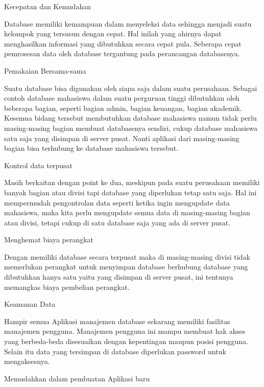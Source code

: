 \documentclass{wileySix}
\begin{document}
\begin{myEnumerate}
	\item Kecepatan dan Kemudahan \par
	Database memiliki kemampuan dalam menyeleksi data sehingga menjadi suatu kelompok yang tersusun dengan cepat. Hal inilah yang ahirnya dapat menghasilkan informasi yang dibutuhkan secara cepat pula. Seberapa cepat pemrosesan data oleh database tergantung pada perancangan databasenya. \par
	\vspace{12pt}
	\noindent 
	\item Pemakaian Bersama-sama \par
	Suatu database bisa digunakan oleh siapa saja dalam suatu perusahaan. Sebagai contoh database mahasiswa dalam suatu perguruan tinggi dibutuhkan oleh beberapa bagian, seperti bagian admin, bagian keuangan, bagian akademik. Kesemua bidang tersebut membutuhkan database mahasiswa namun tidak perlu masing-masing bagian membuat databasenya sendiri, cukup database mahasiswa satu saja yang disimpan di server pusat. Nanti aplikasi dari masing-masing bagian bisa terhubung ke database mahasiswa tersebut. \par
	\vspace{12pt}
	\noindent 
	\item Kontrol data terpusat \par
	Masih berkaitan dengan point ke dua, meskipun pada suatu perusahaan memiliki banyak bagian atau divisi tapi database yang diperlukan tetap satu saja. Hal ini mempermudah pengontrolan data seperti ketika ingin mengupdate data mahasiswa, maka kita perlu mengupdate semua data di masing-masing bagian atau divisi, tetapi cukup di satu database saja yang ada di server pusat. \par
	\vspace{12pt}
	\vspace{12pt}
	\noindent 
	\item Menghemat biaya perangkat \par
	Dengan memiliki database secara terpusat maka di masing-masing divisi tidak memerlukan perangkat untuk menyimpan database berhubung database yang dibutuhkan hanya satu yaitu yang disimpan di server pusat, ini tentunya memangkas biaya pembelian perangkat. \par
	\vspace{12pt}
	\noindent 
	\item Keamanan Data \par
	Hampir semua Aplikasi manajemen database sekarang memiliki fasilitas manajemen pengguna. Manajemen pengguna ini mampu membuat hak akses yang berbeda-beda disesuaikan dengan kepentingan maupun posisi pengguna. Selain itu data yang tersimpan di database diperlukan password untuk mengaksesnya. \par
	\vspace{12pt}
	\noindent 
	\item Memudahkan dalam pembuatan Aplikasi baru\end{myEnumerate}
\end{document}
